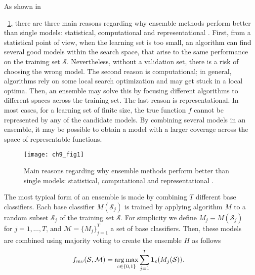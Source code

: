 As shown in \figurename{~\ref{fig:9:1}, there are three main reasons regarding why ensemble 
methods perform better than single models: statistical, computational and representational 
\citep{Dietterich2000a}. First, from a statistical point of view, when the learning set is too 
small, an algorithm can find several good models within the search space, that arise to the same 
performance on the training set $\mathcal{S}$. Nevertheless, without a validation set, there is 
a risk of choosing the wrong model. The second reason is computational; in general, algorithms 
rely on some local search optimization and may get stuck in a local optima. Then, an ensemble may 
solve this by focusing different algorithms to different spaces across the training set. The last 
reason is representational. In most cases, for a learning set of finite size, the  true function 
$f$ cannot be represented by any of the candidate models. By combining several  models in an 
ensemble, it may be possible to obtain a model with a larger coverage across the  space of 
representable functions.
  
\begin{figure}[t!]
\texttt{[image: ch9\_fig1]}
\caption{Main reasons regarding why ensemble methods perform better than 
  single models: statistical, computational and representational \citep{Dietterich2000a}.}
\label{fig:9:1}
\end{figure} 
  
  The most typical form of an ensemble is made by combining $T$ different base classifiers.
  Each  base classifier $M(\mathcal{S}_j)$ is trained by applying algorithm $M$ to a random subset 
  $\mathcal{S}_j$ of the training set $\mathcal{S}$.  %
  For simplicity we define $M_j \equiv  M(\mathcal{S}_j)$ for $j=1,\dots,T$, and 
  $\mathcal{M}=\{M_j\}_{j=1}^{T}$ a set of base classifiers.
  Then, these models are combined using majority voting to create the ensemble $H$ as follows
  \begin{align}\label{eq:9:majority-vote}
    f_{mv}(\mathcal{S},\mathcal{M}) = \operatorname*{arg\,max}_{c \in \{0,1\}} \sum_{j=1}^T 
    \mathbf{1}_c(M_j(\mathcal{S})).
  \end{align}

}
